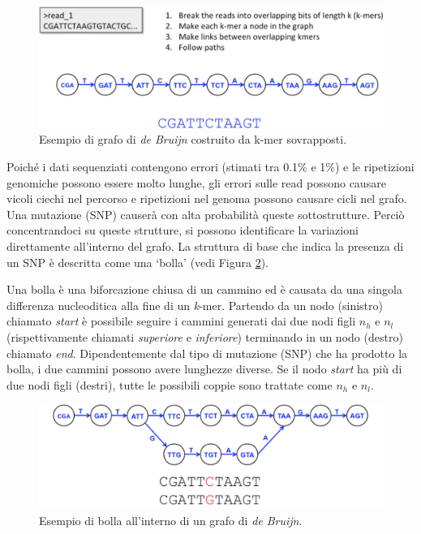 \documentclass[../main.tex]{subfiles}
\begin{document}
\begin{figure}[h!]
	\centering
  	\captionsetup{justification=centering}
  	\includegraphics[scale=.3]{images/dBG.png}
  	\caption{Esempio di grafo di \textit{de Bruijn} costruito da k-mer sovrapposti.}
  	\label{fig:dBG}
\end{figure}

\noindent
Poiché i dati sequenziati contengono errori (stimati tra 0.1\% e 1\%) e le ripetizioni genomiche possono essere molto lunghe, gli errori sulle read possono causare vicoli ciechi nel percorso e ripetizioni nel genoma possono causare cicli nel grafo. Una mutazione (SNP) causerà con alta probabilità queste sottostrutture. Perciò concentrandoci su queste strutture, si possono identificare la variazioni direttamente all'interno del grafo. La struttura di base che indica la presenza di un SNP è descritta come una `bolla' (vedi Figura \ref{fig:dBG_bubble}).

\begin{definition}
\label{def:dBG_bubble}
Una bolla è una biforcazione chiusa di un cammino ed è causata da una singola differenza nucleoditica alla fine di un \textit{k}-mer. Partendo da un nodo (sinistro) chiamato \textit{start} è possibile seguire i cammini generati dai due nodi figli $n_h$ e $n_l$ (rispettivamente chiamati \textit{superiore} e \textit{inferiore}) terminando in un nodo (destro) chiamato \textit{end}. Dipendentemente dal tipo di mutazione (SNP) che ha prodotto la bolla, i due cammini possono avere lunghezze diverse. Se il nodo \textit{start} ha più di due nodi figli (destri), tutte le possibili coppie sono trattate come $n_h$ e $n_l$.
\end{definition}

\begin{figure}[h!]
	\centering
  	\captionsetup{justification=centering}
  	\includegraphics[scale=.3]{images/dBG_bubble.png}
  	\caption{Esempio di bolla all'interno di un grafo di \textit{de Bruijn}.}
  	\label{fig:dBG_bubble}
\end{figure}
\end{document}
